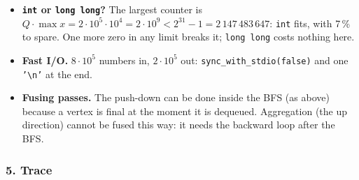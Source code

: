 \begin{tricksbox}
\begin{itemize}[leftmargin=*]
    \item \textbf{\texttt{int} or \texttt{long long}?} The largest counter is $Q \cdot \max x = 2\cdot10^5 \cdot 10^4 = 2\cdot10^9 < 2^{31} - 1 = 2\,147\,483\,647$: \texttt{int} fits, with 7\,\% to spare. One more zero in any limit breaks it; \texttt{long long} costs nothing here.
    \item \textbf{Fast I/O.} $8\cdot10^5$ numbers in, $2\cdot10^5$ out: \texttt{sync\_with\_stdio(false)} and one \texttt{'\textbackslash n'} at the end.
    \item \textbf{Fusing passes.} The push-down can be done inside the BFS (as above) because a vertex is final at the moment it is dequeued. Aggregation (the up direction) cannot be fused this way: it needs the backward loop after the BFS.
\end{itemize}
\end{tricksbox}

\subsubsection*{5. Trace}

